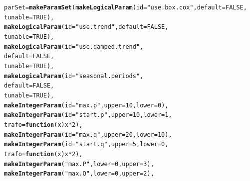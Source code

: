 \documentclass{article}\usepackage[]{graphicx}\usepackage[]{color}
\makeatletter
\newcommand{\hlnum}[1]{\textcolor[rgb]{0.686,0.059,0.569}{#1}}%
\newcommand{\hlstr}[1]{\textcolor[rgb]{0.192,0.494,0.8}{#1}}%
\newcommand{\hlopt}[1]{\textcolor[rgb]{0,0,0}{#1}}%
\newcommand{\hlstd}[1]{\textcolor[rgb]{0.345,0.345,0.345}{#1}}%
\newcommand{\hlkwa}[1]{\textcolor[rgb]{0.161,0.373,0.58}{\textbf{#1}}}%
\newcommand{\hlkwb}[1]{\textcolor[rgb]{0.69,0.353,0.396}{#1}}%
\newcommand{\hlkwc}[1]{\textcolor[rgb]{0.333,0.667,0.333}{#1}}%
\newcommand{\hlkwd}[1]{\textcolor[rgb]{0.737,0.353,0.396}{\textbf{#1}}}%
\newenvironment{kframe}{%
 \def\at@end@of@kframe{}%
 \ifinner\ifhmode%
  \def\at@end@of@kframe{\end{minipage}}%
  \begin{minipage}{\columnwidth}%
 \fi\fi%
 \def\FrameCommand##1{\hskip\@totalleftmargin \hskip-\fboxsep
 \colorbox{shadecolor}{##1}\hskip-\fboxsep
     \hskip-\linewidth \hskip-\@totalleftmargin \hskip\columnwidth}%
 \MakeFramed {\advance\hsize-\width
   \@totalleftmargin\z@ \linewidth\hsize
   \@setminipage}}%
 {\par\unskip\endMakeFramed%
 \at@end@of@kframe}
\newenvironment{knitrout}{}{} %
\theoremstyle{definition}
\makeatother
\begin{document}
                                      
\begin{knitrout}
\color{fgcolor}\begin{kframe}
\begin{alltt}
\hlstd{parSet} \hlkwb{=} \hlkwd{makeParamSet}\hlstd{(}\hlkwd{makeLogicalParam}\hlstd{(}\hlkwc{id} \hlstd{=} \hlstr{"use.box.cox"}\hlstd{,} \hlkwc{default} \hlstd{=} \hlnum{FALSE}\hlstd{,}
                                     \hlkwc{tunable} \hlstd{=} \hlnum{TRUE}\hlstd{),}
                     \hlkwd{makeLogicalParam}\hlstd{(}\hlkwc{id} \hlstd{=} \hlstr{"use.trend"}\hlstd{,} \hlkwc{default} \hlstd{=} \hlnum{FALSE}\hlstd{,}
                                      \hlkwc{tunable} \hlstd{=} \hlnum{TRUE}\hlstd{),}
                     \hlkwd{makeLogicalParam}\hlstd{(}\hlkwc{id} \hlstd{=} \hlstr{"use.damped.trend"}\hlstd{,}
                                      \hlkwc{default} \hlstd{=} \hlnum{FALSE}\hlstd{,}
                                      \hlkwc{tunable} \hlstd{=} \hlnum{TRUE}\hlstd{),}
                     \hlkwd{makeLogicalParam}\hlstd{(}\hlkwc{id} \hlstd{=} \hlstr{"seasonal.periods"}\hlstd{,}
                                      \hlkwc{default} \hlstd{=} \hlnum{FALSE}\hlstd{,}
                                      \hlkwc{tunable} \hlstd{=} \hlnum{TRUE}\hlstd{),}
                     \hlkwd{makeIntegerParam}\hlstd{(}\hlkwc{id} \hlstd{=} \hlstr{"max.p"}\hlstd{,} \hlkwc{upper} \hlstd{=} \hlnum{10}\hlstd{,} \hlkwc{lower} \hlstd{=} \hlnum{0}\hlstd{),}
                     \hlkwd{makeIntegerParam}\hlstd{(}\hlkwc{id} \hlstd{=} \hlstr{"start.p"}\hlstd{,} \hlkwc{upper} \hlstd{=} \hlnum{10}\hlstd{,} \hlkwc{lower} \hlstd{=} \hlnum{1}\hlstd{,}
                                      \hlkwc{trafo} \hlstd{=} \hlkwa{function}\hlstd{(}\hlkwc{x}\hlstd{) x}\hlopt{*}\hlnum{2}\hlstd{),}
                     \hlkwd{makeIntegerParam}\hlstd{(}\hlkwc{id} \hlstd{=} \hlstr{"max.q"}\hlstd{,} \hlkwc{upper} \hlstd{=} \hlnum{20}\hlstd{,} \hlkwc{lower} \hlstd{=} \hlnum{10}\hlstd{),}
                     \hlkwd{makeIntegerParam}\hlstd{(}\hlkwc{id} \hlstd{=} \hlstr{"start.q"}\hlstd{,} \hlkwc{upper} \hlstd{=} \hlnum{5}\hlstd{,} \hlkwc{lower} \hlstd{=} \hlnum{0}\hlstd{,}
                                      \hlkwc{trafo} \hlstd{=} \hlkwa{function}\hlstd{(}\hlkwc{x}\hlstd{) x}\hlopt{*}\hlnum{2}\hlstd{),}
                     \hlkwd{makeIntegerParam}\hlstd{(}\hlstr{"max.P"}\hlstd{,} \hlkwc{lower} \hlstd{=} \hlnum{0}\hlstd{,} \hlkwc{upper} \hlstd{=} \hlnum{3}\hlstd{),}
                     \hlkwd{makeIntegerParam}\hlstd{(}\hlstr{"max.Q"}\hlstd{,} \hlkwc{lower} \hlstd{=} \hlnum{0}\hlstd{,} \hlkwc{upper} \hlstd{=} \hlnum{2}\hlstd{),}

\end{alltt}
\end{kframe}
\end{knitrout}
\end{document}
